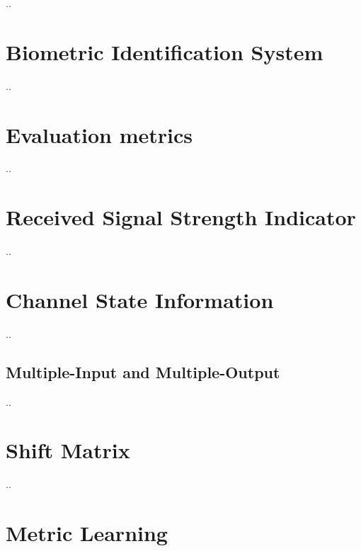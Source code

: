 \label{chp:Preliminary}
..
\section{Biometric Identification System}
\label{sec:Biometrics}
..
\section{Evaluation metrics}
\label{sec:Evaluation}
..
\section{Received Signal Strength Indicator}
\label{sec:RSSI}
..
\section{Channel State Information}
\label{sec:CSI}
..
\subsection{Multiple-Input and Multiple-Output}
\label{sec:MIMO}
..
\section{Shift Matrix}
\label{sec:Shift}
..
\section{Metric Learning}
\label{sec:metric_learning}